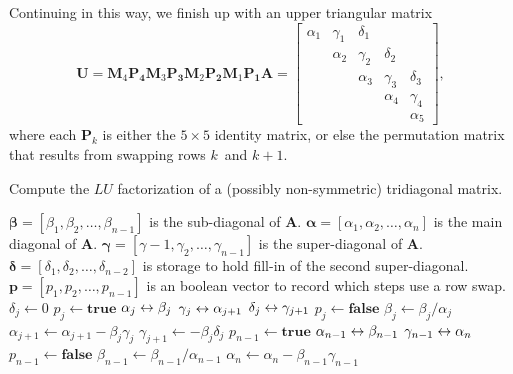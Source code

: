 Continuing in this way, we finish up with an upper triangular matrix
\[
\boldsymbol{U}=
\boldsymbol{M}_4\boldsymbol{P_4}
\boldsymbol{M}_3\boldsymbol{P_3}
\boldsymbol{M}_2\boldsymbol{P_2}
\boldsymbol{M}_1\boldsymbol{P_1}\boldsymbol{A}
=\begin{bmatrix}
\alpha_1&\gamma_1&\delta_1&        &\\
        &\alpha_2&\gamma_2&\delta_2&\\
        &        &\alpha_3&\gamma_3&\delta_3\\
        &        &        &\alpha_4&\gamma_4\\
        &        &        &        &\alpha_5
\end{bmatrix},
\]
where each $\boldsymbol{P}_k$ is either the $5\times5$ identity matrix, or else 
the permutation matrix that results from swapping rows $k$~and $k+1$.  

\begin{algorithm}
\caption{Compute the $LU$ factorization of a (possibly non-symmetric) 
tridiagonal matrix.}
\label{alg: tridiagonal LU}
\begin{algorithmic}
\Require $\boldsymbol{\beta}=[\beta_1,\beta_2,\ldots,\beta_{n-1}]$ is the 
sub-diagonal of $\boldsymbol{A}$.
\Require $\boldsymbol{\alpha}=[\alpha_1,\alpha_2,\ldots,\alpha_n]$ is the main 
diagonal of $\boldsymbol{A}$.
\Require $\boldsymbol{\gamma}=[\gamma-1,\gamma_2,\ldots,\gamma_{n-1}]$ is the 
super-diagonal of $\boldsymbol{A}$.
\Require $\boldsymbol{\delta}=[\delta_1,\delta_2,\ldots,\delta_{n-2}]$ is 
storage to hold fill-in of the second super-diagonal.
\Require $\boldsymbol{p}=[p_1,p_2,\ldots,p_{n-1}]$ is an boolean vector to 
record which steps use a row swap.
\Statex
{}
	\State $\delta_j\gets0$
		\State $p_j\gets\mathbf{true}$
		\State $\alpha_j\leftrightarrow\beta_j$
		\State $\gamma_j\leftrightarrow\alpha_{j+1}$
		\State $\delta_j\leftrightarrow\gamma_{j+1}$
	\Else
		\State $p_j\gets\mathbf{false}$
	\EndIf
	\State $\beta_j\gets\beta_j/\alpha_j$
	\State $\alpha_{j+1}\gets\alpha_{j+1}-\beta_j\gamma_j$
		\State $\gamma_{j+1}\gets-\beta_j\delta_j$
	\EndIf
\EndFor
{}
	\State $p_{n-1}\gets\mathbf{true}$
	\State $\alpha_{n-1}\leftrightarrow\beta_{n-1}$
	\State $\gamma_{n-1}\leftrightarrow\alpha_n$
\Else
	\State $p_{n-1}\gets\mathbf{false}$
\EndIf
\State $\beta_{n-1}\gets\beta_{n-1}/\alpha_{n-1}$
\State $\alpha_n\gets\alpha_n-\beta_{n-1}\gamma_{n-1}$
\EndFunction
\end{algorithmic}
\end{algorithm}

